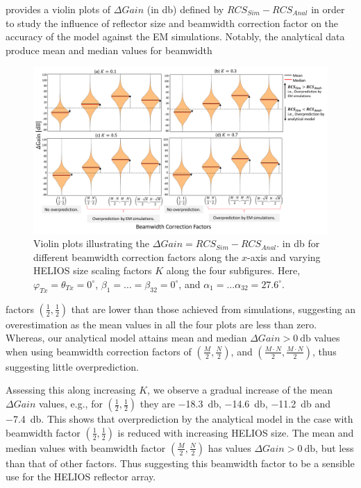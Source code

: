 provides a violin plots of $\Delta Gain$ (in \si{\decibel}) defined by $RCS_{Sim} - RCS_{Anal}$ in order to study the influence of reflector size and beamwidth correction factor on the accuracy of the model against the EM simulations. Notably, the analytical data produce mean and median values for beamwidth
\begin{figure}[H]
	\centering
	\includegraphics[width=1.0\linewidth]{images/Section 4 Images/Casestudy_orthogonal_BCF}
	\caption{Violin plots illustrating the $\Delta Gain = RCS_{Sim} - RCS_{Anal}.$ in \si{\decibel} for different beamwidth correction factors along the $x$-axis and varying HELIOS size scaling factors $K$ along the four subfigures. Here, $\varphi_{Tx}=\theta_{Tx}=0^\circ$, $\beta_1 =  \dots = \beta_{32}= 0^\circ$, and $\alpha_{1}=...\alpha_{32}=\num{27.6}^\circ$.}
	\label{fig:Casestudy_orthogonal_BCF}
\end{figure}
factors $(\frac{1}{2},\frac{1}{2})$ that are lower than those achieved from simulations, suggesting an overestimation as the mean values in all the four plots are less than zero. Whereas, our analytical model attains mean and median $\Delta Gain>\SI{0}{\decibel}$ values when using beamwidth correction factors of $(\frac{M}{2},\frac{N}{2})$, and $(\frac{M\cdot N}{2},\frac{M\cdot N}{2})$, thus suggesting little overprediction.

Assessing this along increasing $K$, we observe a gradual increase of the mean $\Delta Gain$ values, e.g., for $(\frac{1}{2},\frac{1}{2})$ they are \SI{-18.3}{\decibel}, \SI{-14.6}{\decibel}, \SI{-11.2}{\decibel} and \SI{-7.4}{\decibel}. This shows that overprediction by the analytical model in the case with beamwidth factor $(\frac{1}{2},\frac{1}{2})$ is reduced with increasing HELIOS size. The mean and median values with beamwidth factor $(\frac{M}{2},\frac{N}{2})$ has values $\Delta Gain>\SI{0}{\decibel}$, but less than that of other factors. Thus suggesting this beamwidth factor to be a sensible use for the HELIOS reflector array. 

